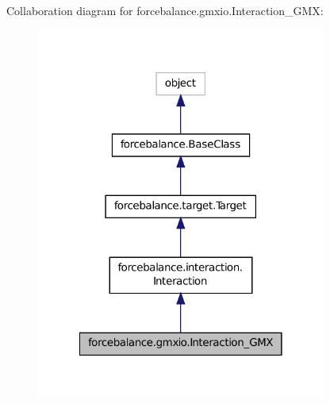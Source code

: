 Collaboration diagram for forcebalance.\-gmxio.\-Interaction\-\_\-\-G\-M\-X\-:
\nopagebreak
\begin{figure}[H]
\begin{center}
\leavevmode
\includegraphics[width=270pt]{classforcebalance_1_1gmxio_1_1Interaction__GMX__coll__graph}
\end{center}
\end{figure}
